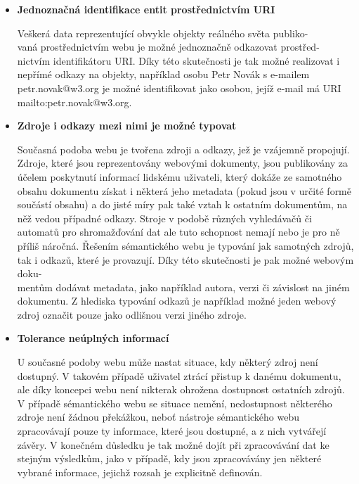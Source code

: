 \documentclass{projekt}
\begin{document}
\begin {itemize}

\item \textbf{Jednoznačná identifikace entit prostřednictvím URI}

\hspace{0.65cm}Veškerá data reprezentující obvykle objekty reálného světa publiko-\\vaná prostřednictvím webu je možné jednoznačně odkazovat prostřed-\\nictvím identifikátoru URI. Díky této skutečnosti je tak možné realizovat i nepřímé odkazy na objekty, například osobu Petr Novák s e-mailem petr.novak@w3.org je možné identifikovat jako osobou, jejíž e-mail má URI mailto:petr.novak@w3.org.


\item \textbf{Zdroje i odkazy mezi nimi je možné typovat}

\hspace{0.65cm}Současná podoba webu je tvořena zdroji a odkazy, jež je vzájemně propojují. Zdroje, které jsou reprezentovány webovými dokumenty, jsou publikovány za účelem poskytnutí informací lidskému uživateli, který dokáže ze samotného obsahu dokumentu získat i některá jeho metadata (pokud jsou v určité formě součástí obsahu) a do jisté míry pak také vztah k ostatním dokumentům, na něž vedou případné odkazy. Stroje v podobě různých vyhledávačů či automatů pro shromažďování dat ale tuto schopnost nemají nebo je pro ně příliš náročná. Řešením sémantického webu je typování jak samotných zdrojů, tak i odkazů, které je provazují. Díky této skutečnosti je pak možné webovým doku-\\mentům dodávat metadata, jako například autora, verzi či závislost na jiném dokumentu. Z hlediska typování odkazů je například možné jeden webový zdroj označit pouze jako odlišnou verzi jiného zdroje.


\item \textbf{Tolerance neúplných informací}

\hspace{0.65cm}U současné podoby webu může nastat situace, kdy některý zdroj není dostupný. V takovém případě uživatel ztrácí přistup k danému dokumentu, ale díky koncepci webu není nikterak ohrožena dostupnost ostatních zdrojů. V případě sémantického webu se situace nemění, nedostupnost některého zdroje není žádnou překážkou, neboť nástroje sémantického webu zpracovávají pouze ty informace, které jsou dostupné, a z nich vytvářejí závěry. V konečném důsledku je tak možné dojít při zpracovávání dat ke stejným výsledkům, jako v případě, kdy jsou zpracovávány jen některé vybrané informace, jejichž rozsah je explicitně definován.


\end{itemize}
\end{document}

